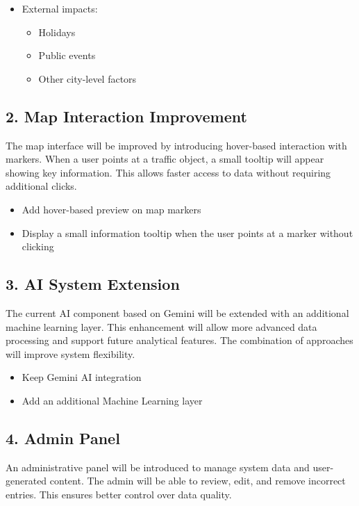 \documentclass[12pt,a4paper]{report}
\begin{document}
\begin{itemize}
\begin{itemize}
        \item External impacts:
        \begin{itemize}
            \item Holidays
            \item Public events
            \item Other city-level factors
        \end{itemize}
    \end{itemize}
\end{itemize}

\subsection*{2. Map Interaction Improvement}
The map interface will be improved by introducing hover-based interaction with markers. When a user points at a traffic object, a small tooltip will appear showing key information. This allows faster access to data without requiring additional clicks.

\begin{itemize}
    \item Add hover-based preview on map markers
    \item Display a small information tooltip when the user points at a marker without clicking
\end{itemize}

\subsection*{3. AI System Extension}
The current AI component based on Gemini will be extended with an additional machine learning layer. This enhancement will allow more advanced data processing and support future analytical features. The combination of approaches will improve system flexibility.

\begin{itemize}
    \item Keep Gemini AI integration
    \item Add an additional Machine Learning layer
\end{itemize}

\subsection*{4. Admin Panel}
An administrative panel will be introduced to manage system data and user-generated content. The admin will be able to review, edit, and remove incorrect entries. This ensures better control over data quality.
\end{document}
